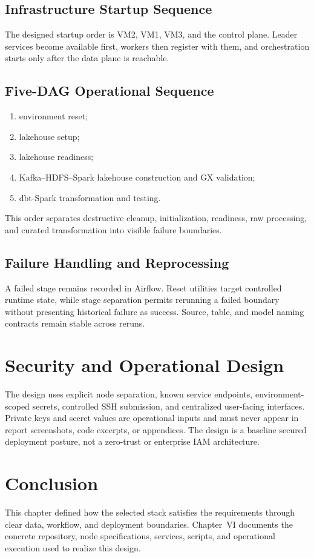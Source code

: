 \subsection{Infrastructure Startup Sequence}
The designed startup order is VM2, VM1, VM3, and the control plane. Leader services become available first, workers then register with them, and orchestration starts only after the data plane is reachable.

\subsection{Five-DAG Operational Sequence}
\begin{enumerate}
    \item environment reset;
    \item lakehouse setup;
    \item lakehouse readiness;
    \item Kafka--HDFS--Spark lakehouse construction and GX validation;
    \item dbt-Spark transformation and testing.
\end{enumerate}
This order separates destructive cleanup, initialization, readiness, raw processing, and curated transformation into visible failure boundaries.

\subsection{Failure Handling and Reprocessing}
A failed stage remains recorded in Airflow. Reset utilities target controlled runtime state, while stage separation permits rerunning a failed boundary without presenting historical failure as success. Source, table, and model naming contracts remain stable across reruns.

\section{Security and Operational Design}
The design uses explicit node separation, known service endpoints, environment-scoped secrets, controlled SSH submission, and centralized user-facing interfaces. Private keys and secret values are operational inputs and must never appear in report screenshots, code excerpts, or appendices. The design is a baseline secured deployment posture, not a zero-trust or enterprise IAM architecture.

\section{Conclusion}
This chapter defined how the selected stack satisfies the requirements through clear data, workflow, and deployment boundaries. Chapter~VI documents the concrete repository, node specifications, services, scripts, and operational execution used to realize this design.